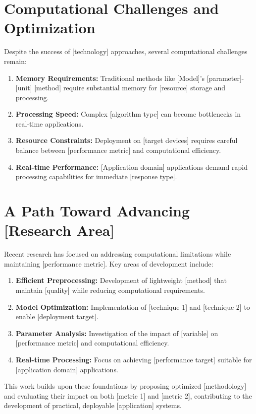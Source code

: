 \section{Computational Challenges and Optimization}

Despite the success of [technology] approaches, several computational challenges remain:

\begin{enumerate}
\item \textbf{Memory Requirements:} Traditional methods like [Model]'s [parameter]-[unit] [method] require substantial memory for [resource] storage and processing.

\item \textbf{Processing Speed:} Complex [algorithm type] can become bottlenecks in real-time applications.

\item \textbf{Resource Constraints:} Deployment on [target devices] requires careful balance between [performance metric] and computational efficiency.

\item \textbf{Real-time Performance:} [Application domain] applications demand rapid processing capabilities for immediate [response type].
\end{enumerate}

\section{A Path Toward Advancing [Research Area]}

Recent research has focused on addressing computational limitations while maintaining [performance metric]. Key areas of development include:

\begin{enumerate}
\item \textbf{Efficient Preprocessing:} Development of lightweight [method] that maintain [quality] while reducing computational requirements.

\item \textbf{Model Optimization:} Implementation of [technique 1] and [technique 2] to enable [deployment target].

\item \textbf{Parameter Analysis:} Investigation of the impact of [variable] on [performance metric] and computational efficiency.

\item \textbf{Real-time Processing:} Focus on achieving [performance target] suitable for [application domain] applications.
\end{enumerate}

This work builds upon these foundations by proposing optimized [methodology] and evaluating their impact on both [metric 1] and [metric 2], contributing to the development of practical, deployable [application] systems.